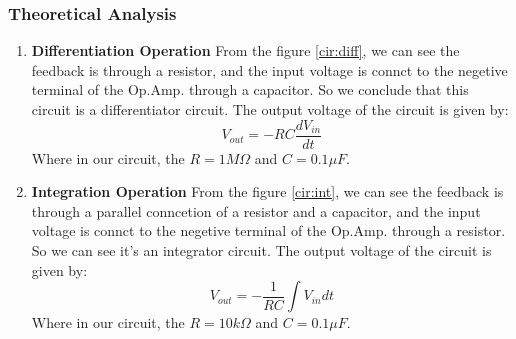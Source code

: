     \subsubsection{Theoretical Analysis}
        \begin{enumerate}
            \item \textbf{Differentiation Operation}\newline
                From the figure \ref{cir:diff}, 
                we can see the feedback is through a resistor, and the input voltage is connct to the negetive terminal of the Op.Amp. through a capacitor. 
                So we conclude that this circuit is a differentiator circuit. The output voltage of the circuit is given by:
                \begin{equation}
                    V_{out} = -RC\frac{dV_{in}}{dt}
                \end{equation}
                Where in our circuit, the $R = 1M \Omega$ and $C = 0.1\mu F$.
                \newline

            \item \textbf{Integration Operation}\newline
                From the figure \ref{cir:int}, 
                we can see the feedback is through a parallel conncetion of a resistor and a capacitor, and the input voltage is connct to the negetive terminal of the Op.Amp. through a resistor.
                So we can see it's an integrator circuit. The output voltage of the circuit is given by:
                \begin{equation}
                    V_{out} = -\frac{1}{RC}\int V_{in}dt
                \end{equation}
                Where in our circuit, the $R = 10k \Omega$ and $C = 0.1\mu F$.
                \newline


\end{enumerate}
